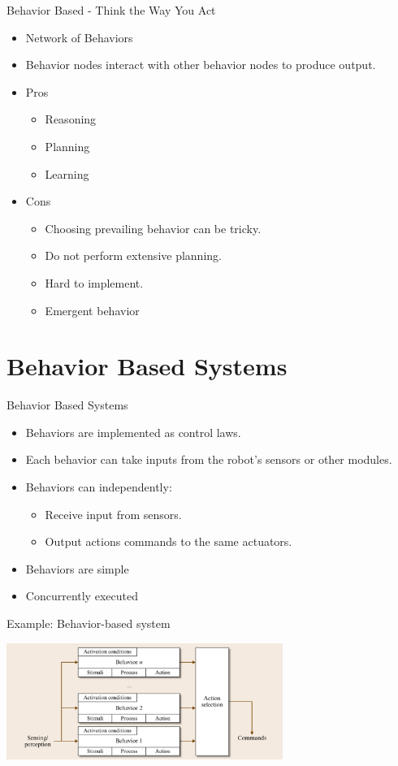 \documentclass{beamer}
\begin{document}
\begin{frame}{Behavior Based - Think the Way You Act}
 \begin{itemize}
   \item Network of Behaviors
   \item Behavior nodes interact with other behavior nodes to produce output.
   \item Pros
   \begin{itemize}
     \item Reasoning
     \item Planning
     \item Learning
   \end{itemize}
   \item Cons
   \begin{itemize}
     \item Choosing prevailing behavior can be tricky.
     \item Do not perform extensive planning.
     \item Hard to implement.
     \item Emergent behavior
   \end{itemize}
 \end{itemize}
\end{frame}

\section{Behavior Based Systems}
\begin{frame}{Behavior Based Systems}
 \begin{itemize}
  \item Behaviors are implemented as control laws.
  \item Each behavior can take inputs from the robot's sensors or other modules.
  \item Behaviors can independently:
  \begin{itemize}
    \item Receive input from sensors.
    \item Output actions commands to the same actuators.
  \end{itemize}
  \item Behaviors are simple
  \item Concurrently executed
 \end{itemize}
\end{frame}

\begin{frame}{Example: Behavior-based system}
 \begin{center}
  \includegraphics[width=9cm]{behavior_system.png}
 \end{center}
  \end{frame}
\end{document}
